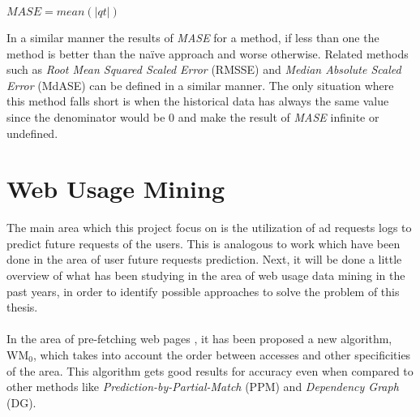 \begin{center}
\Large
\begin{math}
  MASE = mean(\left|qt\right|)
\end{math}
\normalsize
\end{center}

In a similar manner the results of \emph{MASE} for a method, if less than one
the method is better than the na\"{i}ve approach and worse otherwise.
Related methods such as \emph{Root Mean Squared Scaled Error} (RMSSE) and
\emph{Median Absolute Scaled Error} (MdASE) can be defined in a similar manner.
The only situation where this method falls short is when the historical data has
always the same value since the denominator would be 0 and make the result of
\emph{MASE} infinite or undefined.


\section{Web Usage Mining}\label{sec:network}

\nocite{UjwalaPatil}

The main area which this project focus on is the utilization of ad requests logs
to predict future requests of the users. This is analogous to work which have
been done in the area of user future requests prediction. Next, it will be done
a little overview of what has been studying in the area of web usage data mining
in the past years, in order to identify possible approaches to solve the problem
of this thesis.

\paragraph{}

In the area of pre-fetching web pages \cite{Nanopoulos01effectiveprediction}, it
has been proposed a new algorithm, WM\begin{math}_0\end{math}, which takes into
  account the order between accesses and other specificities of the area. This
  algorithm gets good results for accuracy even when compared to other methods
  like \emph{Prediction-by-Partial-Match} (PPM) and \emph{Dependency Graph}
  (DG).

\paragraph{}

